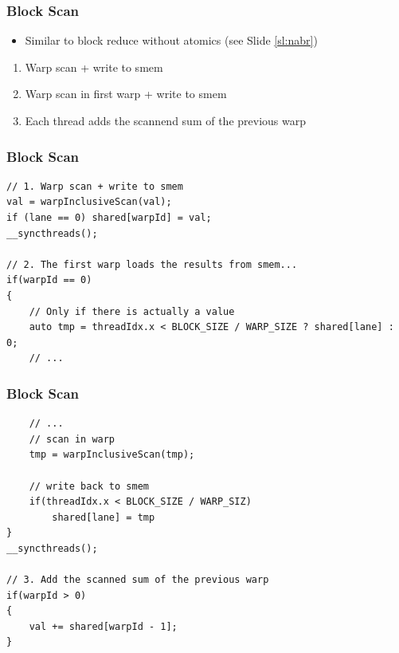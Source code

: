 \documentclass[aspectratio=169]{beamer}
\begin{document}
\begin{frame}[fragile]
\frametitle{Block Scan}
\begin{itemize}
	\item Similar to block reduce without atomics (see Slide \ref{sl:nabr})
\end{itemize}
\begin{enumerate}
	\item Warp scan + write to smem
	\item Warp scan in first warp + write to smem
	\item Each thread adds the scannend sum of the previous warp
\end{enumerate}

\end{frame}


\begin{frame}[fragile]
\frametitle{Block Scan}

\begin{lstlisting}
// 1. Warp scan + write to smem
val = warpInclusiveScan(val);
if (lane == 0) shared[warpId] = val;
__syncthreads();

// 2. The first warp loads the results from smem...
if(warpId == 0)
{
	// Only if there is actually a value
	auto tmp = threadIdx.x < BLOCK_SIZE / WARP_SIZE ? shared[lane] : 0;
	// ...
\end{lstlisting}
\end{frame}


\begin{frame}[fragile]
\frametitle{Block Scan}


\begin{lstlisting}
	// ...
	// scan in warp
	tmp = warpInclusiveScan(tmp); 
	
	// write back to smem
	if(threadIdx.x < BLOCK_SIZE / WARP_SIZ)
		shared[lane] = tmp
}
__syncthreads();

// 3. Add the scanned sum of the previous warp
if(warpId > 0)
{
	val += shared[warpId - 1];
}
\end{lstlisting}
\end{frame}
\end{document}
